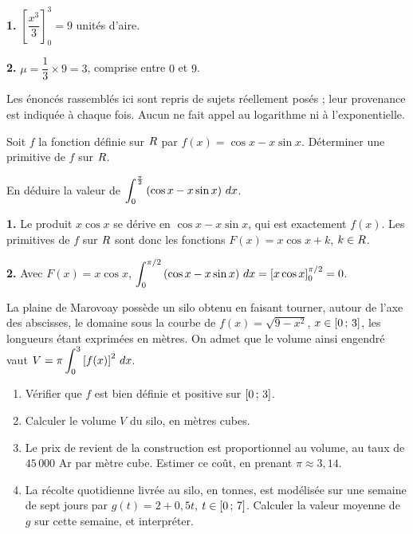 \begin{corrige}
\textbf{1.} $\left[\dfrac{x^{3}}{3}\right]_{0}^{3} = 9$ unités d'aire.

\textbf{2.} $\mu = \dfrac{1}{3}\times 9 = 3$, comprise entre $0$ et $9$.
\end{corrige}

\begin{annales}
Les énoncés rassemblés ici sont repris de sujets réellement posés ; leur
provenance est indiquée à chaque fois. Aucun ne fait appel au logarithme ni à
l'exponentielle.

Soit $f$ la fonction définie sur $R$ par $f(x) = \cos x - x\sin x$. Déterminer
une primitive de $f$ sur $R$.

En déduire la valeur de
$\displaystyle\int_{0}^{\frac{\pi}{2}}\left(\cos x - x\sin x\right)\,dx$.
\end{annales}

\begin{corrige}[annales]
\textbf{1.} Le produit $x\cos x$ se dérive en $\cos x - x\sin x$, qui est
exactement $f(x)$. Les primitives de $f$ sur $R$ sont donc les fonctions
$F(x) = x\cos x + k$, $k\in R$.

\textbf{2.} Avec $F(x) = x\cos x$,
$\displaystyle\int_{0}^{\pi/2}\left(\cos x - x\sin x\right)\,dx
  = \left[x\cos x\right]_{0}^{\pi/2} = 0$.
\end{corrige}

\begin{jecherche}
La plaine de Marovoay possède un silo obtenu en faisant tourner, autour de
l'axe des abscisses, le domaine sous la courbe de
$f(x) = \sqrt{9-x^{2}}$, $x \in \left[0\,;\,3\right]$, les longueurs étant
exprimées en mètres. On admet que le volume ainsi engendré vaut
$V = \pi\displaystyle\int_{0}^{3}\left[f(x)\right]^{2}\,dx$.

\begin{enumerate}[label=\textbf{\arabic*.}, leftmargin=*, itemsep=0.3em]
  \item Vérifier que $f$ est bien définie et positive sur $\left[0\,;\,3\right]$.
  \item Calculer le volume $V$ du silo, en mètres cubes.
  \item Le prix de revient de la construction est proportionnel au volume, au
        taux de $45\,000$ Ar par mètre cube. Estimer ce coût, en prenant
        $\pi \approx 3{,}14$.
  \item La récolte quotidienne livrée au silo, en tonnes, est modélisée sur
        une semaine de sept jours par $g(t) = 2+0{,}5t$, $t \in \left[0\,;\,7\right]$.
        Calculer la valeur moyenne de $g$ sur cette semaine, et interpréter.
\end{enumerate}
\end{jecherche}

